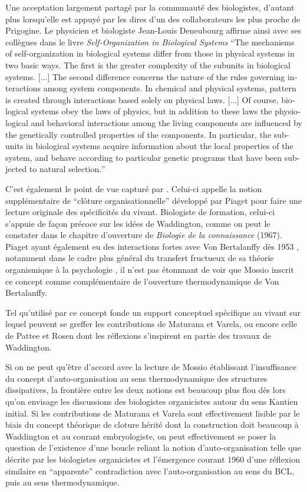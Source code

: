 Une acceptation largement partagé par la communauté des biologistes, d'autant plus lorsqu'elle est appuyé par les dires d'un des collaborateurs les plus proche de Prigogine. Le physicien et biologiste Jean-Louis Deneubourg affirme ainsi avec ses collègues dans le livre \textit{Self-Organization in Biological Systems} \foreignquote{english}{The mechanisms of self-organization in biological systems differ from those in physical systems in two basic ways. The first is the greater complexity of the subunits in biological systems. [...] The second difference concerns the nature of the rules governing interactions among system components. In chemical and physical systems, pattern is created through interactions based solely on physical laws. [...] Of course, biological systems obey the laws of physics, but in addition to these laws the physiological and behavioral interactions among the living components are influenced by the genetically controlled properties of the components. In particular, the subunits in biological systems acquire information about the local properties of the system, and behave according to particular genetic programs that have been subjected to natural selection.} \autocite[12-13]{Camazine2003}

C'est également le point de vue capturé par \textcite{Mossio2014}. Celui-ci  appelle la notion supplémentaire de \enquote{clôture organisationnelle} développé par Piaget pour faire une lecture originale des spécificités du vivant. Biologiste de formation, celui-ci s'appuie de façon précoce sur les idées de Waddington, comme on peut le constater dans le chapitre d'ouverture de \textit{Biologie de la connaissance} (1967). Piaget ayant également eu des interactions fortes avec Von Bertalanffy dès 1953 \autocite[310-311]{Pouvreau2013}, notamment dans le cadre plus général du transfert fructueux de sa théorie organismique à la psychologie \autocite[945-951]{Pouvreau2013}, il n'est pas étonnnant de voir que Mossio inscrit ce concept comme complémentaire de l'ouverture thermodynamique de Von Bertalanffy.

Tel qu'utilisé par \textcite{Mossio2014} ce concept  fonde un support conceptuel spécifique au vivant sur lequel peuvent se greffer les contributions de Maturana et Varela, ou encore celle de Pattee et Rosen dont les réflexions s'inspirent en partie des travaux de Waddington.

Si on ne peut qu'être d'accord avec la lecture de Mossio établissant l'insuffisance du concept d'auto-organisation au sens thermodynamique des structures dissipatives, la frontière entre les deux notions est beaucoup plus flou dès lors qu'on envisage les discussions des biologistes organicistes autour du sens Kantien initial. Si les contributions de Maturana et Varela sont effectivement lisible par le biais du concept théorique de cloture hérité dont la construction doit beaucoup à Waddington et au courant embryologiste, on peut effectivement se poser la question de l'existence d'une boucle reliant la notion d'auto-organisation telle que décrite par les biologistes organicistes et l'émergence courant 1960 d'une réflexion similaire en \enquote{apparente} contradiction avec l'auto-organisation au sens du BCL, puis au sens thermodynamique.

